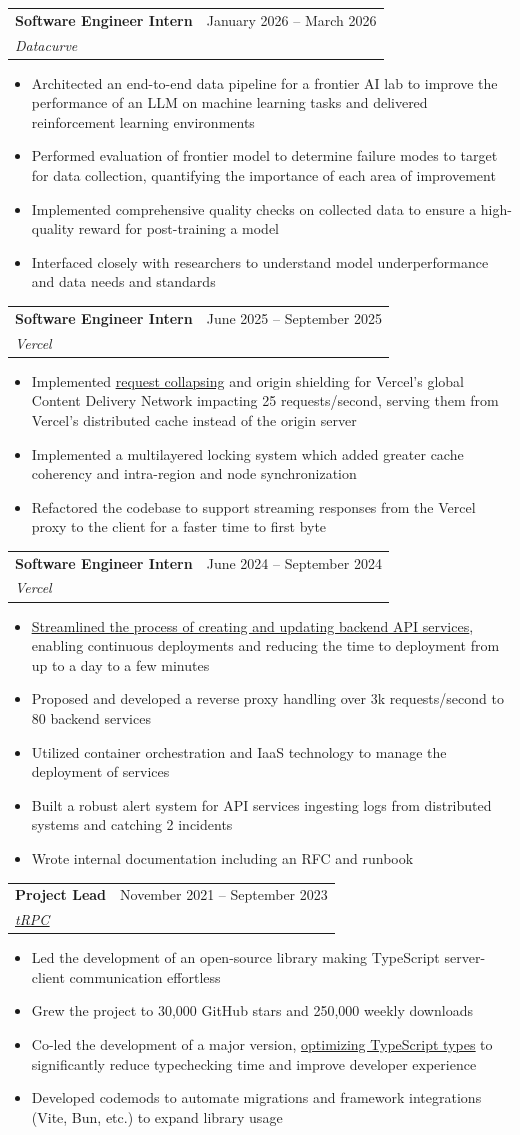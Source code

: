 \documentclass[letterpaper,11pt]{article}
\makeatletter
\newcommand{\resumeItem}[1]{
  \item\small{
    {#1 \vspace{-2pt}}
  }
}
\newcommand{\resumeSubheading}[3]{
  \vspace{-2pt}\item
    \begin{tabular*}{0.97\textwidth}[t]{l@{\extracolsep{\fill}}r}
      \textbf{#1} & #2 \\
      \textit{\small#3} \\
    \end{tabular*}\vspace{-7pt}
}
\newcommand{\resumeItemListStart}{\begin{itemize}}
\newcommand{\resumeItemListEnd}{\end{itemize}\vspace{-5pt}}
\makeatother
\begin{document}
    \resumeSubheading
      {Software Engineer Intern}{January 2026 -- March 2026}
      {Datacurve}
      \resumeItemListStart
        \resumeItem{Architected an end-to-end data pipeline for a frontier AI lab to improve the performance of an LLM on machine learning tasks and delivered reinforcement learning environments}
        \resumeItem{Performed evaluation of frontier model to determine failure modes to target for data collection, quantifying the importance of each area of improvement}
        \resumeItem{Implemented comprehensive quality checks on collected data to ensure a high-quality reward for post-training a model}
        \resumeItem{Interfaced closely with researchers to understand model underperformance and data needs and standards}
      \resumeItemListEnd

    \resumeSubheading
      {Software Engineer Intern}{June 2025 -- September 2025}
      {Vercel}
      \resumeItemListStart
        \resumeItem{Implemented \href{https://vercel.com/blog/cdn-request-collapsing}{\underline{request collapsing}} and origin shielding for Vercel's global Content Delivery Network impacting 25 requests/second, serving them from Vercel's distributed cache instead of the origin server}
        \resumeItem{Implemented a multilayered locking system which added greater cache coherency and intra-region and node synchronization}
        \resumeItem{Refactored the codebase to support streaming responses from the Vercel proxy to the client for a faster time to first byte}
      \resumeItemListEnd

    \resumeSubheading
      {Software Engineer Intern}{June 2024 -- September 2024}
      {Vercel}
      \resumeItemListStart
        \resumeItem{
        \href{https://x.com/cramforce/status/1835866844378575235}{\underline{Streamlined the process of creating and updating backend API services}}, enabling continuous deployments and reducing the time to deployment from up to a day to a few minutes}
        \resumeItem{Proposed and developed a reverse proxy handling over 3k requests/second to 80 backend services}
        \resumeItem{Utilized container orchestration and IaaS technology to manage the deployment of services}
        \resumeItem{Built a robust alert system for API services ingesting logs from distributed systems and catching 2 incidents}
        \resumeItem{Wrote internal documentation including an RFC and runbook}
      \resumeItemListEnd
      
    \resumeSubheading
      {Project Lead}{November 2021 -- September 2023}
      {\href{https://trpc.io}{\underline{tRPC}}}
      \resumeItemListStart
        \resumeItem{Led the development of an open-source library making TypeScript server-client communication effortless}
        \resumeItem{Grew the project to 30,000 GitHub stars and 250,000 weekly downloads}
        \resumeItem{Co-led the development of a major version, \href{https://trpc.io/blog/typescript-performance-lessons}{\underline{optimizing TypeScript types}} to significantly reduce typechecking time and improve developer experience}
        \resumeItem{Developed codemods to automate migrations and framework integrations (Vite, Bun, etc.) to expand library usage}
      \resumeItemListEnd
\end{document}
